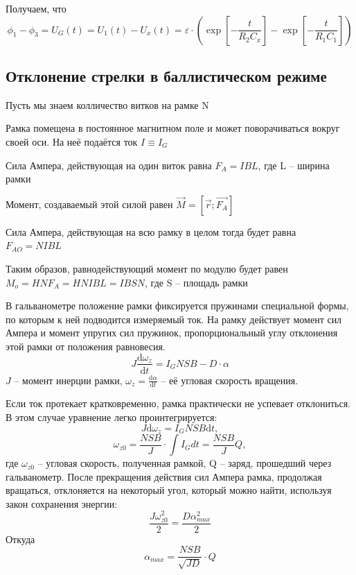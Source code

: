 \documentclass[a4paper,12pt]{extarticle}
\begin{document}
Получаем, что
\begin{equation}
 \phi_1-\phi_3 =U_G(t)=U_1(t)-U_x(t)= \varepsilon \cdot 
	\left( 
		\exp\left[		
			-\frac{t}{R_2 C_x}
		\right]
		-
		\exp\left[		
			-\frac{t}{R_1 C_1}
		\right]
 	\right)
\end{equation}


\subsection{Отклонение стрелки в баллистическом режиме}

Пусть мы знаем колличество витков на рамке N

Рамка помещена в постоянное магнитном поле и может поворачиваться вокруг своей оси. На неё подаётся ток $I\equiv I_G$

Сила Ампера, действующая на один виток равна $F_A=I B L$, где L -- ширина рамки

Момент, создаваемый этой силой равен $ \overrightarrow{M}=\left[ \overrightarrow{r};\overrightarrow{F_A} \right]$

Сила Ампера, действующая на всю рамку в целом тогда будет равна $F_{AO}=NIBL$

Таким образов, равнодействующий момент по модулю будет равен $M_o=HNF_A=HNIBL=IBSN$, где S -- площадь рамки

В гальванометре положение рамки фиксируется пружинами специальной формы, по которым к ней подводится измеряемый ток. На рамку действует момент сил Ампера и момент упругих сил пружинок, пропорциональный углу отклонения этой рамки от положения равновесия.
\begin{equation}
J \frac{\mathrm{d}\omega_z }{\mathrm{d} t}= I_GNSB- D \cdot \alpha
\end{equation}
$J$ -- момент инерции рамки, $\omega_z=\frac{\mathrm{d}\alpha }{\mathrm{d} t}$ -- её угловая скорость вращения.

Если ток протекает кратковременно, рамка практически не успевает отклониться. В этом случае уравнение  легко проинтегрируется:
\begin{equation}
	J \mathrm{d} \omega_z =  I_GNSB\mathrm{d} t,
\end{equation}
\begin{equation}
\omega_{z0}=\frac{NSB}{J} \cdot \int I_G dt= \frac{NSB}{J}Q ,
\end{equation} 
  где $ \omega_{z0}$ -- угловая скорость, полученная рамкой, Q -- заряд, прошедший через гальванометр. После прекращения действия сил Ампера рамка, продолжая вращаться, отклоняется на некоторый угол, который можно найти, используя закон сохранения энергии:
  \begin{equation}
  \frac{J\omega_{z0}^2}{2}= \frac{D\alpha^2_{max}}{2}
   \end{equation}
Откуда
  \begin{equation}
\alpha_{max}=\frac{NSB}{\sqrt{JD}}\cdot Q 
  \end{equation}
\end{document}
